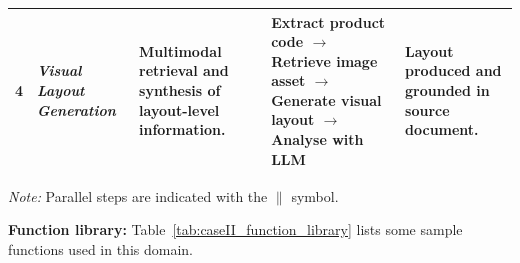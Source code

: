 \documentclass[largeformat]{interact}
\begin{document}
\begin{table}[!htbp]
\begin{tabularx}{\textwidth}{c p{2.2cm} X p{5cm} X}
    \midrule
    
    4 & \textit{Visual Layout Generation} &
    Multimodal retrieval and synthesis of layout-level information. &
    Extract product code $\rightarrow$ Retrieve image asset
    $\rightarrow$ Generate visual layout $\rightarrow$ Analyse with LLM &
    Layout produced and grounded in source document. \\
    
    \bottomrule
    \end{tabularx}
    
    \vspace{2mm}
    \raggedright
    \footnotesize
    \textit{Note:} Parallel steps are indicated with the $\parallel$ symbol.
\end{table}

\noindent \textbf{Function library:}
Table~\ref{tab:caseII_function_library} lists some sample functions used in this domain.
\end{document}

